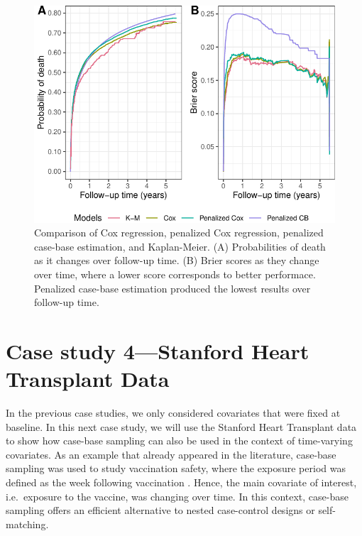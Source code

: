 \documentclass[
]{jss}
\begin{document}
\begin{CodeChunk}
\begin{figure}

{\centering \includegraphics[width=\textwidth,keepaspectratio=true]{../figures/riskregressionBrier-1} 

}

\caption{\label{fig:cs3FinalBrier} Comparison of Cox regression, penalized Cox regression, penalized case-base estimation, and Kaplan-Meier. (A)  Probabilities of death as it changes over follow-up time. (B) Brier scores as they change over time, where a lower score corresponds to better performace. Penalized case-base estimation produced the lowest results over follow-up time.}\label{fig:riskregressionBrier}
\end{figure}
\end{CodeChunk}

\hypertarget{case-study-4stanford-heart-transplant-data}{%
\section{Case study 4---Stanford Heart Transplant
Data}\label{case-study-4stanford-heart-transplant-data}}

In the previous case studies, we only considered covariates that were
fixed at baseline. In this next case study, we will use the Stanford
Heart Transplant data
\citep[\citet{crowley1977covariance}]{clark1971cardiac} to show how
case-base sampling can also be used in the context of time-varying
covariates. As an example that already appeared in the literature,
case-base sampling was used to study vaccination safety, where the
exposure period was defined as the week following vaccination
\citep{saarela2015case}. Hence, the main covariate of interest,
i.e.~exposure to the vaccine, was changing over time. In this context,
case-base sampling offers an efficient alternative to nested
case-control designs or self-matching.
\end{document}
